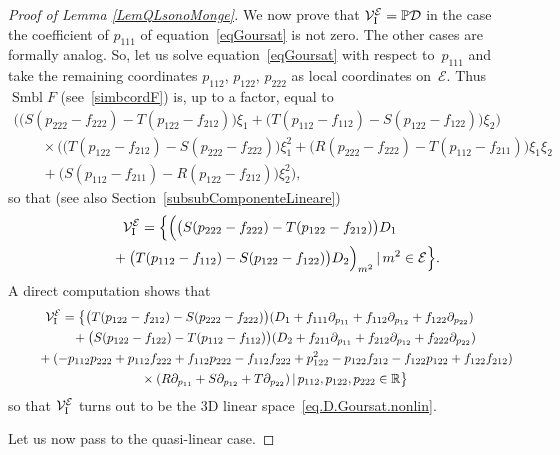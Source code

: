 \documentclass[pdftex]{sigma}
\newcommand{\D}{\mathcal{D}}
\newcommand{\MM}{\mathcal{V}_{\textrm{\normalfont I}}}
\newcommand{\E}{\mathcal{E}}
\renewcommand{\P}{\mathbb{P}}
\numberwithin{equation}{section}
\begin{document}
\begin{proof}[Proof of Lemma \ref{LemQLsonoMonge}]
We now prove that $\MM^\E=\P\D$ in the case the coef\/f\/icient of $p_{111}$ of equation~\eqref{eqGoursat} is not zero. The other cases are formally analog. So, let us solve equation~\eqref{eqGoursat} with respect to~$p_{111}$ and take the remaining coordinates $p_{112}$, $p_{122}$, $p_{222}$ as local coordinates on~$\E$. Thus~$\operatorname{Smbl} F$ (see~\eqref{simbcordF}) is, up to a factor, equal to
\begin{gather}
\Big(\big(S(p_{222}-f_{222})-T(p_{122}-f_{212})\big)\xi_1+\big(T(p_{112}-f_{112})-S(p_{122}-f_{122})\big)\xi_2\Big)\nonumber \\
\qquad{}\times \Big(\big(T(p_{122}-f_{212})-S(p_{222}-f_{222})\big)\xi_1^2
+\big(R(p_{222}-f_{222})-T(p_{112}-f_{211})\big)\xi_1\xi_2\nonumber\\
\qquad{}+\big(S(p_{112}-f_{211})-R(p_{122}-f_{212})\big)\xi_2^2\Big),\label{eqSimboloPazzesco}
\end{gather}
so that (see also Section~\ref{subsubComponenteLineare})
\begin{gather}
 \MM^\E =\Big\{\Big(\big(S(p_{222}-f_{222})-T(p_{122}-f_{212})\big)D_1
 \nonumber\\
\hphantom{\MM^\E =}{} + \big(T(p_{112}-f_{112})-S(p_{122}-f_{122})\big)D_2\Big)_{m^2} \,|\, m^2\in\E\Big\}.\label{eq.V1.Goursat.nonlin}
\end{gather}
A direct computation shows that
\begin{gather*}
 \MM^\E=\big\{\big(T(p_{122}-f_{212})-S(p_{222}-f_{222})\big)(D_1 + f_{111}\partial_{p_{11}} + f_{112}\partial_{p_{12}} + f_{122}\partial_{p_{22}})
\\
\hphantom{\MM^\E=}{} +
\big(S(p_{122}-f_{122})-T(p_{112}-f_{112})\big)(D_2 + f_{211}\partial_{p_{11}} + f_{212}\partial_{p_{12}} + f_{222}\partial_{p_{22}})
\\
\hphantom{\MM^\E=}{}
+ (-p_{112}p_{222}+p_{112}f_{222}+f_{112}p_{222}-f_{112}f_{222}
+p_{122}^2-p_{122}f_{212}-f_{122}p_{122}+f_{122}f_{212})\! \\
\hphantom{\MM^\E=}{}
\times (R\partial_{p_{11}}+S\partial_{p_{12}}+T\partial_{p_{22}})\,|\,
p_{112},p_{122},p_{222}\in\mathbb{R}
\big\}%
\end{gather*}
so that $ \MM^\E$ turns out to be the 3D linear space~\eqref{eq.D.Goursat.nonlin}.

Let us now pass to the quasi-linear case.


\end{proof}
\end{document}
